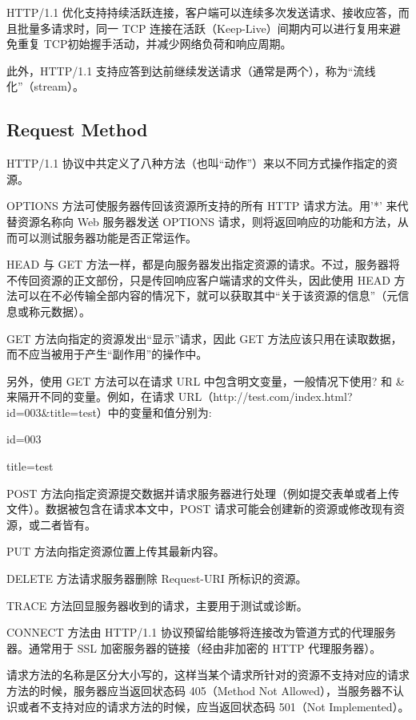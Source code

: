 HTTP/1.1 优化支持持续活跃连接，客户端可以连续多次发送请求、接收应答，而且批量多请求时，同一 TCP 连接在活跃（Keep-Live）间期内可以进行复用来避免重复 TCP初始握手活动，并减少网络负荷和响应周期。

此外，HTTP/1.1 支持应答到达前继续发送请求（通常是两个），称为“流线化”（stream）。

\subsection{Request Method}

HTTP/1.1 协议中共定义了八种方法（也叫“动作”）来以不同方式操作指定的资源。

OPTIONS 方法可使服务器传回该资源所支持的所有 HTTP 请求方法。用’*’ 来代替资源名称向 Web 服务器发送 OPTIONS 请求，则将返回响应的功能和方法，从而可以测试服务器功能是否正常运作。

HEAD 与 GET 方法一样，都是向服务器发出指定资源的请求。不过，服务器将不传回资源的正文部份，只是传回响应客户端请求的文件头，因此使用 HEAD 方法可以在不必传输全部内容的情况下，就可以获取其中“关于该资源的信息”（元信息或称元数据）。

GET 方法向指定的资源发出“显示”请求，因此 GET 方法应该只用在读取数据，而不应当被用于产生“副作用”的操作中。

另外，使用 GET 方法可以在请求 URL 中包含明文变量，一般情况下使用? 和 \&来隔开不同的变量。例如，在请求 URL（http://test.com/index.html?id=003\&title=test）中的变量和值分别为:

\begin{compactitem}
\item id=003
\item title=test
\end{compactitem}

POST 方法向指定资源提交数据并请求服务器进行处理（例如提交表单或者上传文件）。数据被包含在请求本文中，POST 请求可能会创建新的资源或修改现有资源，或二者皆有。

PUT 方法向指定资源位置上传其最新内容。

DELETE 方法请求服务器删除 Request-URI 所标识的资源。

TRACE 方法回显服务器收到的请求，主要用于测试或诊断。

CONNECT 方法由 HTTP/1.1 协议预留给能够将连接改为管道方式的代理服务器。通常用于 SSL 加密服务器的链接（经由非加密的 HTTP 代理服务器）。


请求方法的名称是区分大小写的，这样当某个请求所针对的资源不支持对应的请求方法的时候，服务器应当返回状态码 405（Method Not Allowed），当服务器不认识或者不支持对应的请求方法的时候，应当返回状态码 501（Not Implemented）。

